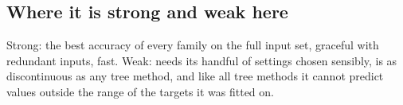 \documentclass[11pt]{article}
\begin{document}
\subsection*{Where it is strong and weak here}
Strong: the best accuracy of every family on the full input set, graceful with redundant inputs, fast. Weak: needs its handful of settings chosen sensibly, is as discontinuous as any tree method, and like all tree methods it cannot predict values outside the range of the targets it was fitted on.
\end{document}
